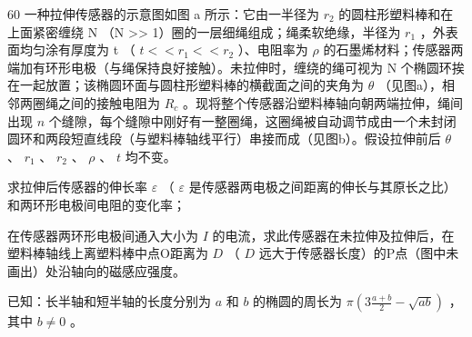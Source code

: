 \begin{problem}[33届物理竞赛复赛]{60}
    一种拉伸传感器的示意图如图 a 所示：它由一半径为 $r_{2}$ 的圆柱形塑料棒和在上面紧密缠绕 N （N >> 1）圈的一层细绳组成；绳柔软绝缘，半径为 $r_{1}$ ，外表面均匀涂有厚度为 t （ $t << r_{1} << r_{2}$ ）、电阻率为 $\rho$ 的石墨烯材料；传感器两端加有环形电极（与绳保持良好接触）。未拉伸时，缠绕的绳可视为 N 个椭圆环挨在一起放置；该椭圆环面与圆柱形塑料棒的横截面之间的夹角为 $\theta$ （见图a），相邻两圈绳之间的接触电阻为 $R_{c}$ 。现将整个传感器沿塑料棒轴向朝两端拉伸，绳间出现 $n$ 个缝隙，每个缝隙中刚好有一整圈绳，这圈绳被自动调节成由一个未封闭圆环和两段短直线段（与塑料棒轴线平行）串接而成（见图b）。假设拉伸前后 $\theta$ 、 $r_1$ 、 $r_2$ 、 $\rho$ 、 $t$ 均不变。

    \begin{subproblem}
        求拉伸后传感器的伸长率 $\varepsilon$ （ $\varepsilon$ 是传感器两电极之间距离的伸长与其原长之比）和两环形电极间电阻的变化率；
    \end{subproblem}
    \begin{subproblem}
        在传感器两环形电极间通入大小为 $I$ 的电流，求此传感器在未拉伸及拉伸后，在塑料棒轴线上离塑料棒中点O距离为 $D$ （ $D$ 远大于传感器长度）的P点（图中未画出）处沿轴向的磁感应强度。
    \end{subproblem}

    已知：长半轴和短半轴的长度分别为 $a$ 和 $b$ 的椭圆的周长为 $\pi (3\frac{a + b}{2} -\sqrt{ab})$ ，其中 $b\neq 0$ 。
\end{problem}